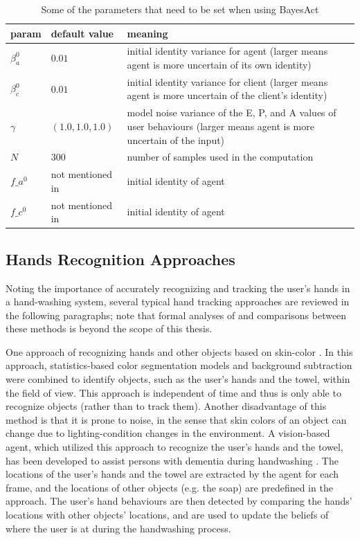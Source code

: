 \begin{table}
\centering
\caption{Some of the parameters that need to be set when using BayesAct}
\label{table:bayesact-param}
\begin{tabular}{| l | l | p{9.4cm} |}
\hline
param & default value & meaning \\ \hline
$\beta_{a}^{0}$ & $0.01$ & initial identity variance for agent (larger means agent is more uncertain of its own identity) \\ \hline
$\beta_{c}^{0}$ & $0.01$ & initial identity variance for client (larger means agent is more uncertain of the client's identity) \\ \hline
$\gamma$ & $(1.0, 1.0, 1.0)$ & model noise variance of the E, P, and A values of user behaviours (larger means agent is more uncertain of the input) \\ \hline
$N$ & $300$ & number of samples used in the computation \\ \hline
$f\_a^{0}$ & not mentioned in \cite{hoey2013bayesian} & initial identity of agent \\ \hline
$f\_c^{0}$ & not mentioned in \cite{hoey2013bayesian} & initial identity of agent \\ \hline
\end{tabular}
\end{table}

\subsection{Hands Recognition Approaches}

Noting the importance of accurately recognizing and tracking the user's hands in a hand-washing system, several typical hand tracking approaches are reviewed in the following paragraphs; note that formal analyses of and comparisons between these methods is beyond the scope of this thesis.

One approach of recognizing hands and other objects based on skin-color \cite{mihailidis2004use}. In this approach, statistics-based color segmentation models and background subtraction were combined to identify objects, such as the user's hands and the towel, within the field of view. This approach is independent of time and thus is only able to recognize objects (rather than to track them). Another disadvantage of this method is that it is prone to noise, in the sense that skin colors of an object can change due to lighting-condition changes in the environment. A vision-based agent, which utilized this approach to recognize the user's hands and the towel, has been developed to assist persons with dementia during handwashing \cite{boger2005decision}. The locations of the user's hands and the towel are extracted by the agent for each frame, and the locations of other objects (e.g. the soap) are predefined in the approach. The user's hand behaviours are then detected by comparing the hands' locations with other objects' locations, and are used to update the beliefs of where the user is at during the handwashing process. 

